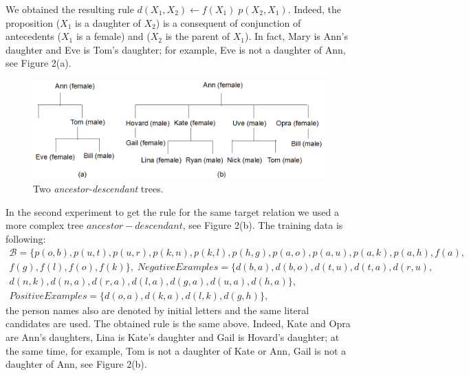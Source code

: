 \documentclass{scrartcl}
\begin{document}
We obtained the resulting rule $d(X_1, X_2)\leftarrow f(X_1)\; p(X_2, X_1)$. Indeed, the proposition ($X_1$ is a daughter of $X_2$) is a consequent of conjunction of antecedents  ($X_1$ is a female) and ($X_2$ is the parent of $X_1$). In fact,  Mary is Ann's daughter and Eve is Tom's daughter; for example, Eve is not a daughter of Ann,  see Figure 2(a).
\begin{figure}[h!] \centering
\includegraphics[bb =0 0 1055 346,scale =0.28]{tree_ds.png}
\caption{Two \emph{ancestor-descendant} trees.}
\end{figure}

In the second experiment to get the rule for the same target relation we used a more complex tree $ancestor-descendant$,  see Figure 2(b). The training data is following:
\begin{multline}\label{eq14}
\!\!\!\!\mathcal{B}=\! \{p(o, b), p(u, t), p(u, r), p(k, n), p(k, l), p(h, g), p(a, o), p(a, u), p(a, k), p(a, h),
f(a),\\
f(g), f(l), f(o), f(k)\}, \;
NegativeExamples=\!\! \{d(b, a), d(b, o), d(t, u), d(t, a), d(r, u), \\
d(n,k), d(n,a), d(r, a), d(l, a), d(g, a), d(u, a), d(h, a) \},\\
PositiveExamples= \{d(o, a), d(k, a), d(l, k), d(g, h) \},
\end{multline}
the person names also are denoted by initial letters and the same literal candidates are used.
The obtained rule is the same above. Indeed, Kate and Opra are Ann's daughters, Lina is Kate's daughter and Gail is Hovard's daughter; at the same time, for example, Tom is not a daughter of Kate or Ann,  Gail is not a daughter of Ann,  see Figure 2(b).
\end{document}
